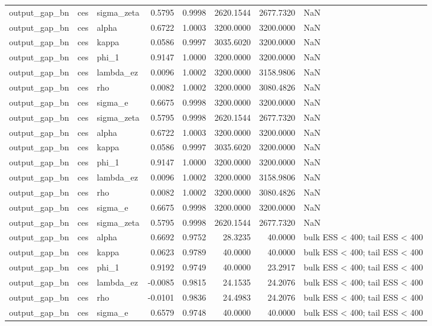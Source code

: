 \begin{tabular}{lllrrrrl}
output\_gap\_bn & ces & sigma\_zeta & 0.5795 & 0.9998 & 2620.1544 & 2677.7320 & NaN \\
output\_gap\_bn & ces & alpha & 0.6722 & 1.0003 & 3200.0000 & 3200.0000 & NaN \\
output\_gap\_bn & ces & kappa & 0.0586 & 0.9997 & 3035.6020 & 3200.0000 & NaN \\
output\_gap\_bn & ces & phi\_1 & 0.9147 & 1.0000 & 3200.0000 & 3200.0000 & NaN \\
output\_gap\_bn & ces & lambda\_ez & 0.0096 & 1.0002 & 3200.0000 & 3158.9806 & NaN \\
output\_gap\_bn & ces & rho & 0.0082 & 1.0002 & 3200.0000 & 3080.4826 & NaN \\
output\_gap\_bn & ces & sigma\_e & 0.6675 & 0.9998 & 3200.0000 & 3200.0000 & NaN \\
output\_gap\_bn & ces & sigma\_zeta & 0.5795 & 0.9998 & 2620.1544 & 2677.7320 & NaN \\
output\_gap\_bn & ces & alpha & 0.6722 & 1.0003 & 3200.0000 & 3200.0000 & NaN \\
output\_gap\_bn & ces & kappa & 0.0586 & 0.9997 & 3035.6020 & 3200.0000 & NaN \\
output\_gap\_bn & ces & phi\_1 & 0.9147 & 1.0000 & 3200.0000 & 3200.0000 & NaN \\
output\_gap\_bn & ces & lambda\_ez & 0.0096 & 1.0002 & 3200.0000 & 3158.9806 & NaN \\
output\_gap\_bn & ces & rho & 0.0082 & 1.0002 & 3200.0000 & 3080.4826 & NaN \\
output\_gap\_bn & ces & sigma\_e & 0.6675 & 0.9998 & 3200.0000 & 3200.0000 & NaN \\
output\_gap\_bn & ces & sigma\_zeta & 0.5795 & 0.9998 & 2620.1544 & 2677.7320 & NaN \\
output\_gap\_bn & ces & alpha & 0.6692 & 0.9752 & 28.3235 & 40.0000 & bulk ESS < 400; tail ESS < 400 \\
output\_gap\_bn & ces & kappa & 0.0623 & 0.9789 & 40.0000 & 40.0000 & bulk ESS < 400; tail ESS < 400 \\
output\_gap\_bn & ces & phi\_1 & 0.9192 & 0.9749 & 40.0000 & 23.2917 & bulk ESS < 400; tail ESS < 400 \\
output\_gap\_bn & ces & lambda\_ez & -0.0085 & 0.9815 & 24.1535 & 24.2076 & bulk ESS < 400; tail ESS < 400 \\
output\_gap\_bn & ces & rho & -0.0101 & 0.9836 & 24.4983 & 24.2076 & bulk ESS < 400; tail ESS < 400 \\
output\_gap\_bn & ces & sigma\_e & 0.6579 & 0.9748 & 40.0000 & 40.0000 & bulk ESS < 400; tail ESS < 400 \\

\end{tabular}
